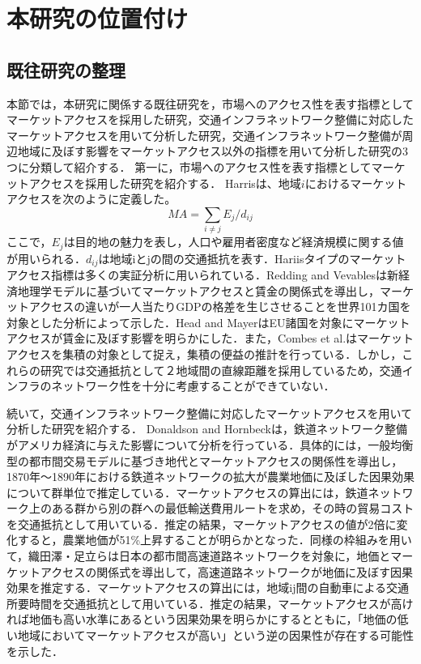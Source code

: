 \chapter{本研究の位置付け}

\section{既往研究の整理}
本節では，本研究に関係する既往研究を，市場へのアクセス性を表す指標としてマーケットアクセスを採用した研究，交通インフラネットワーク整備に対応したマーケットアクセスを用いて分析した研究，交通インフラネットワーク整備が周辺地域に及ぼす影響をマーケットアクセス以外の指標を用いて分析した研究の3つに分類して紹介する．
第一に，市場へのアクセス性を表す指標としてマーケットアクセスを採用した研究を紹介する．
Harris\cite{harrisc1954}は、地域$i$におけるマーケットアクセスを次のように定義した。
\[ MA = \sum_{i \neq j}{E_{j}/d_{ij}}\]
ここで，$E_{j}$は目的地の魅力を表し，人口や雇用者密度など経済規模に関する値が用いられる．$d_{ij}$は地域iとjの間の交通抵抗を表す．Hariisタイプのマーケットアクセス指標は多くの実証分析に用いられている．Redding and Vevables\cite{redding2004}は新経済地理学モデルに基づいてマーケットアクセスと賃金の関係式を導出し，マーケットアクセスの違いが一人当たりGDPの格差を生じさせることを世界101カ国を対象とした分析によって示した．Head and Mayer\cite{head2006}はEU諸国を対象にマーケットアクセスが賃金に及ぼす影響を明らかにした．また，Combes et al.\cite{combes2010}はマーケットアクセスを集積の対象として捉え，集積の便益の推計を行っている．しかし，これらの研究では交通抵抗として２地域間の直線距離を採用しているため，交通インフラのネットワーク性を十分に考慮することができていない．
 
続いて，交通インフラネットワーク整備に対応したマーケットアクセスを用いて分析した研究を紹介する．
Donaldson and Hornbeck\cite{donaldson2016}は，鉄道ネットワーク整備がアメリカ経済に与えた影響について分析を行っている．具体的には，一般均衡型の都市間交易モデルに基づき地代とマーケットアクセスの関係性を導出し，1870年〜1890年における鉄道ネットワークの拡大が農業地価に及ぼした因果効果について群単位で推定している．マーケットアクセスの算出には，鉄道ネットワーク上のある群から別の群への最低輸送費用ルートを求め，その時の貿易コストを交通抵抗として用いている．推定の結果，マーケットアクセスの値が2倍に変化すると，農業地価が51\%上昇することが明らかとなった．同様の枠組みを用いて，織田澤・足立ら\cite{otazawa2022}は日本の都市間高速道路ネットワークを対象に，地価とマーケットアクセスの関係式を導出して，高速道路ネットワークが地価に及ぼす因果効果を推定する．マーケットアクセスの算出には，地域ij間の自動車による交通所要時間を交通抵抗として用いている．推定の結果，マーケットアクセスが高ければ地価も高い水準にあるという因果効果を明らかにするとともに，「地価の低い地域においてマーケットアクセスが高い」という逆の因果性が存在する可能性を示した．

